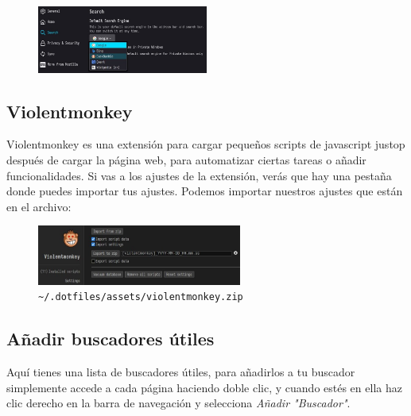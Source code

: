 \documentclass[11pt]{article}
\begin{document}
\begin{figure}[h!]
{\includegraphics[width=0.5\textwidth,height=0.175\textwidth]{images/search-engine.jpg}}
\end{figure}%

\vspace{-20pt}

\subsection{Violentmonkey}

Violentmonkey es una extensión para cargar pequeños scripts de javascript justop después de cargar la página web, para automatizar ciertas tareas o añadir funcionalidades. Si vas a los ajustes de la extensión, verás que hay una pestaña donde puedes importar tus ajustes. Podemos importar nuestros ajustes que están en el archivo:

\begin{figure}[h!]
	\captionsetup{labelformat=empty}
	\centering
	\includegraphics[width=0.6\textwidth]{images/violentmonkey.jpg}
	\cprotect\caption{\verb|~/.dotfiles/assets/violentmonkey.zip|}
\end{figure}

\vspace{-20pt}

\subsection{Añadir buscadores útiles}

Aquí tienes una lista de buscadores útiles, para añadirlos a tu buscador simplemente accede a cada página haciendo doble clic, y cuando estés en ella haz clic derecho en la barra de navegación y selecciona \textit{Añadir "Buscador"}.
\end{document}
